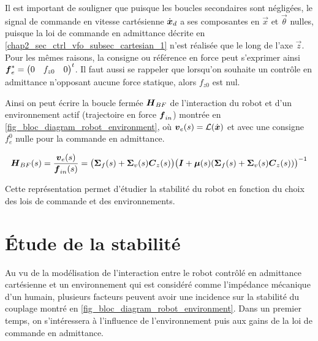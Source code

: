 Il est important de souligner que puisque les boucles secondaires sont négligées, le signal de commande en vitesse cartésienne $\dot{\vect{x}}_d$ a ses composantes en $\vec{x}$ et $\vec{\theta}$ nulles, puisque la loi de commande en admittance décrite en \cref{chap2_sec_ctrl_vfo_subsec_cartesian_1} n'est réalisée que le long de l'axe $\vec{z}$. Pour les mêmes raisons, la consigne ou référence en force peut s'exprimer ainsi $\vect{f}_{e}^* = \begin{pmatrix}0 & f_{z0} & 0\end{pmatrix}^t$. Il faut aussi se rappeler que lorsqu'on souhaite un contrôle en admittance n'opposant aucune force statique, alors $f_{z0}$ est nul.

Ainsi on peut écrire la boucle fermée $\matr{H}_{BF}$ de l'interaction du robot et d'un environnement actif (trajectoire en force $\vect{f}_{in}$) montrée en \cref{fig_bloc_diagram_robot_environment}, où $\vect{V}_e(s) = \Laplace(\dot{\vect{x}})$ et avec une consigne $f_{e}^0$ nulle pour la commande en admittance. 

\begin{equation} \label{eq_close_loop_system}
	\matr{H}_{BF}(s) = \frac{\vect{V}_e(s)}{\vect{f}_{in}(s)} = \big( \matr{\Sigma}_f(s) + \matr{\Sigma}_v(s)\matr{C}_z(s) \big)\textcolor{black}{\big(\matr{I} + \matr{\mu}(s)( \matr{\Sigma}_f(s) + \matr{\Sigma}_v(s)\matr{C}_z(s) )\big)^{-1}}
\end{equation}

Cette représentation permet d'étudier la stabilité du robot en fonction du choix des lois de commande et des environnements.

\section{Étude de la stabilité} \label{chap5_sec_stability_study}

Au vu de la modélisation de l'interaction entre le robot contrôlé en admittance cartésienne et un environnement qui est considéré comme l'impédance mécanique d'un humain, plusieurs facteurs peuvent avoir une incidence sur la stabilité du couplage montré en \cref{fig_bloc_diagram_robot_environment}. Dans un premier temps, on s'intéressera à l'influence de l'environnement puis aux gains de la loi de commande en admittance.

